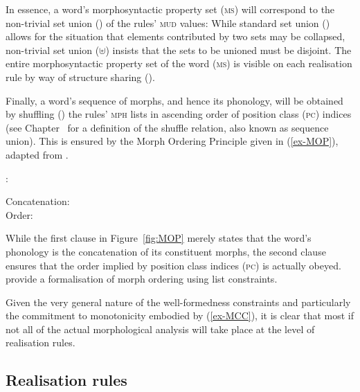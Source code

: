 \documentclass[output=paper
	        ,collection
	        ,collectionchapter
 	        ,biblatex
                ,babelshorthands
                ,newtxmath
                ,draftmode
                ,colorlinks, citecolor=brown
]{langscibook}
\begin{document}
\begin{exe}
\begin{xlist}
In essence, a word's morphosyntactic property set (\textsc{ms}) will
correspond to the non-trivial set union (\isi{$\uplus$}) of the rules'
\textsc{mud} values: While standard set union (\isi{$\cup$}) allows for the
situation that elements contributed by two sets may be collapsed,
non-trivial set union ($\uplus$) insists that the sets to be unioned
must be disjoint.  The entire morphosyntactic property set of the word
(\textsc{ms}) is visible on each realisation rule by way of structure
sharing ().

Finally, a word's sequence of morphs, and hence its phonology, will
be obtained by shuffling (\isi{$\bigcirc$}) the rules' \textsc{mph} lists in
ascending order of position class (\textsc{pc}) indices (see
Chapter~ for a definition of the shuffle
relation, also known as
sequence union). This is ensured by the Morph
Ordering Principle given in (\ref{ex-MOP}), adapted from
\citet{Crysmann:Bonami:2016}.

\begin{exe}
  \ex\label{ex-MOP}
:
\begin{xlist}
\ex Concatenation:\\
\ex Order:\\
\zl

While the first clause in Figure~\ref{fig:MOP} merely states that the
word's phonology is the concatenation of its constituent morphs, the
second clause ensures that the order implied by position class indices
(\textsc{pc}) is actually obeyed. \citet{bonami_o-crysmann_b13hpsg}
provide a formalisation of morph ordering using list constraints.


Given the very general nature of the well-formedness constraints and
particularly the commitment to monotonicity embodied by
(\ref{ex-MCC}), it is clear that most if not all of the actual
morphological analysis will take place at the level of realisation
rules.


\subsection{Realisation rules}


\end{xlist}
\end{exe}
\end{xlist}
\end{exe}
\end{document}
